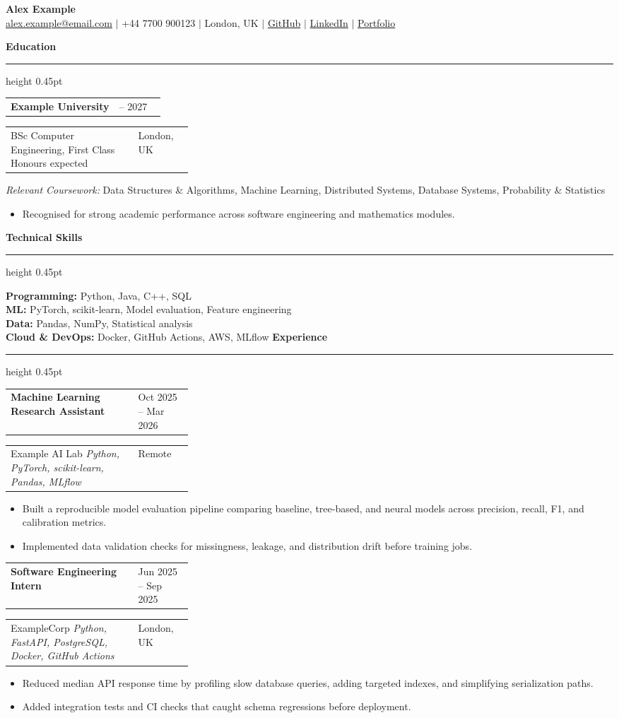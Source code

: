 \documentclass[10pt,a4paper]{article}
\makeatletter
\newcommand{\cvsection}[1]{%
  \vspace{6pt}%
  {\large\bfseries\color{AccentBlue} #1}\\[-2pt]%
  {\color{AccentBlue}\hrule height 0.45pt}%
  \vspace{3pt}%
}
\newcommand{\cvrow}[2]{%
  \begin{tabularx}{\linewidth}{@{}X>{\raggedleft\arraybackslash}p{0.30\linewidth}@{}}
    #1 & #2
  \end{tabularx}
}
\newcommand{\cventryspace}{\vspace{2pt}}
\makeatother
\begin{document}
\begin{center}
  {\LARGE\bfseries Alex Example}\\[3pt]
  \small\href{mailto:alex.example@email.com}{alex.example@email.com} $\vert$ +44 7700 900123 $\vert$ London, UK $\vert$ \href{\detokenize{https://github.com/alex-example}}{GitHub} $\vert$ \href{\detokenize{https://www.linkedin.com/in/alex-example}}{LinkedIn} $\vert$ \href{\detokenize{https://alexexample.dev}}{Portfolio}
\end{center}

\cvsection{ Education }
\cvrow{\textbf{ Example University }}{ 2023 -- 2027 }
\cvrow{ BSc Computer Engineering, First Class Honours expected}{ London, UK }
\textit{Relevant Coursework:} Data Structures \& Algorithms, Machine Learning, Distributed Systems, Database Systems, Probability \& Statistics
\begin{itemize}
  \item Recognised for strong academic performance across software engineering and mathematics modules.
\end{itemize}
\cventryspace

\cvsection{ Technical Skills }
\textbf{ Programming:} Python, Java, C++, SQL\\[1pt]\textbf{ ML:} PyTorch, scikit-learn, Model evaluation, Feature engineering\\[1pt]\textbf{ Data:} Pandas, NumPy, Statistical analysis\\[1pt]\textbf{ Cloud \& DevOps:} Docker, GitHub Actions, AWS, MLflow
\cvsection{ Experience }
\cvrow{\textbf{ Machine Learning Research Assistant }}{ Oct 2025 -- Mar 2026 }
\cvrow{ Example AI Lab \textbar{} \textit{ Python, PyTorch, scikit-learn, Pandas, MLflow }}{ Remote }
\begin{itemize}
  \item Built a reproducible model evaluation pipeline comparing baseline, tree-based, and neural models across precision, recall, F1, and calibration metrics.
  \item Implemented data validation checks for missingness, leakage, and distribution drift before training jobs.
\end{itemize}
\cventryspace
\cvrow{\textbf{ Software Engineering Intern }}{ Jun 2025 -- Sep 2025 }
\cvrow{ ExampleCorp \textbar{} \textit{ Python, FastAPI, PostgreSQL, Docker, GitHub Actions }}{ London, UK }
\begin{itemize}
  \item Reduced median API response time by profiling slow database queries, adding targeted indexes, and simplifying serialization paths.
  \item Added integration tests and CI checks that caught schema regressions before deployment.
\end{itemize}
\cventryspace
\end{document}
